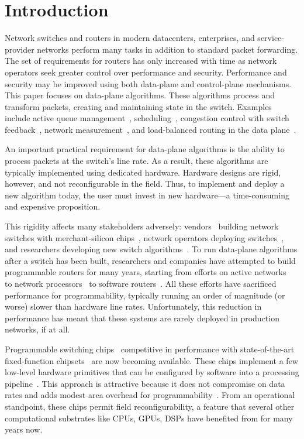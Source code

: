\section{Introduction}
\label{s:intro}

Network switches and routers in modern datacenters, enterprises, and
service-provider networks perform many tasks in addition to standard
packet forwarding. The set of requirements for routers has only
increased with time as network operators seek greater control over
performance and security.  Performance and security may be improved
using both data-plane and control-plane mechanisms. This paper focuses
on data-plane algorithms. These algorithms process and transform
packets, creating and maintaining state in the switch. Examples
include active queue management~\cite{red,blue,avq,codel,pie},
scheduling~\cite{pifo-hotnets}, congestion control with switch
feedback~\cite{xcp, rcp, pdq, dctcp}, network
measurement~\cite{opensketch, bitmap_george, elephant_george}, and
load-balanced routing in the data plane~\cite{conga}.

An important practical requirement for data-plane algorithms is the
ability to process packets at the switch's line rate.  As a result,
these algorithms are typically implemented using dedicated
hardware. Hardware designs are rigid, however, and not reconfigurable
in the field. Thus, to implement and deploy a new algorithm today, the
user must invest in new hardware---a time-consuming and expensive
proposition.

This rigidity affects many stakeholders adversely:
vendors~\cite{cisco_nexus, dell_force10, arista_7050} building network
switches with merchant-silicon chips~\cite{trident, tomahawk,
  mellanox}, network operators deploying
switches~\cite{google,facebook,vl2}, and researchers developing new
switch algorithms~\cite{xcp, codel, d3, detail, pdq}.  To run
data-plane algorithms after a switch has been built, researchers and
companies have attempted to build programmable routers for many years,
starting from efforts on active networks~\cite{active-nets} to network
processors~\cite{npu_survey} to software
routers~\cite{click,routebricks}. All these efforts have sacrificed
performance for programmability, typically running an order of
magnitude (or worse) slower than hardware line rates. Unfortunately,
this reduction in performance has meant that these systems are rarely
deployed in production networks, if at all.

Programmable switching chips~\cite{flexpipe, xpliant, rmt, corsa,
  uadp, algo_logic} competitive in performance with state-of-the-art
fixed-function chipsets~\cite{trident, tomahawk, mellanox} are now
becoming available. These chips implement a few low-level hardware
primitives that can be configured by software into a processing
pipeline~\cite{xpliant_sdk,xpliant_sdk2,intel_sdk}.  This approach is
attractive because it does not compromise on data rates and adds
modest area overhead for programmability~\cite{rmt}. From an
operational standpoint, these chips permit field reconfigurability, a
feature that several other computational substrates like CPUs, GPUs,
DSPs have benefited from for many years now.

